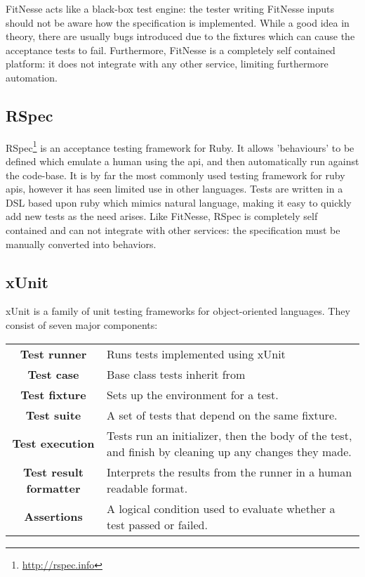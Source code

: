 FitNesse acts like a black-box test engine: the tester writing FitNesse inputs should not be aware how the specification is implemented. While a good idea in theory, there are usually bugs introduced due to the fixtures which can cause the acceptance tests to fail.  Furthermore, FitNesse is a completely self contained platform: it does not integrate with any other service, limiting furthermore automation.

\subsection{RSpec}

RSpec\footnote{\url{http://rspec.info}} is an acceptance testing framework for Ruby. It allows 'behaviours' to be defined which emulate a human using the api, and then automatically run against the code-base. It is by far the most commonly used testing framework for ruby apis, however it has seen limited use in other languages. Tests are written in a DSL based upon ruby which mimics natural language, making it easy to quickly add new tests as the need arises. Like FitNesse, RSpec is completely self contained and can not integrate with other services: the specification must be manually converted into behaviors.

\subsection{xUnit}

xUnit is a family of unit testing frameworks for object-oriented languages. They consist of seven major components:

\begin{tabular}{c  p{10cm}}
\textbf{Test runner} & Runs tests implemented using xUnit \\
\textbf{Test case} & Base class tests inherit from \\
\textbf{Test fixture} & Sets up the environment for a test. \\
\textbf{Test suite} & A set of tests that depend on the same fixture. \\
\textbf{Test execution} & Tests run an initializer, then the body of the test, and finish by cleaning up any changes they made. \\
\textbf{Test result formatter} & Interprets the results from the runner in a human readable format. \\
\textbf{Assertions} & A logical condition used to evaluate whether a test passed or failed. \\
\end{tabular}

